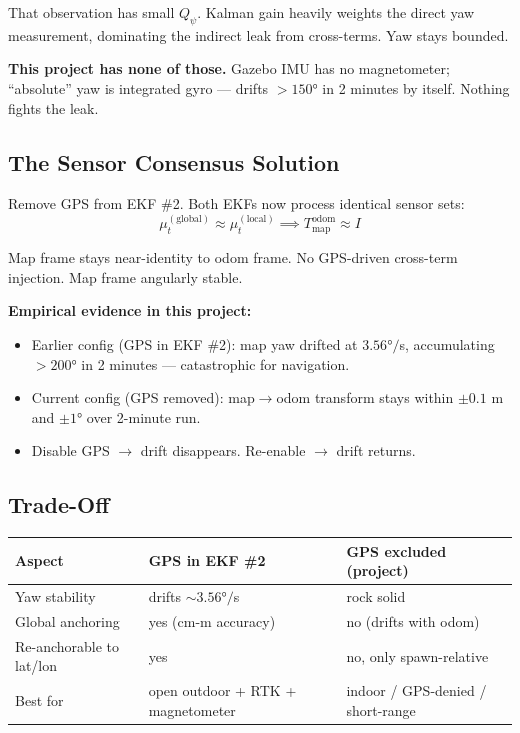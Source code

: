 \documentclass[11pt,a4paper]{article}
\begin{document}
That observation has small $Q_\psi$. Kalman gain heavily weights the direct yaw measurement, dominating the indirect leak from cross-terms. Yaw stays bounded.

\textbf{This project has none of those.} Gazebo IMU has no magnetometer; ``absolute'' yaw is integrated gyro --- drifts $> 150°$ in 2 minutes by itself. Nothing fights the leak.

\subsection{The Sensor Consensus Solution}

Remove GPS from EKF \#2. Both EKFs now process identical sensor sets:
\[
\mu_t^{(\text{global})} \approx \mu_t^{(\text{local})} \implies T_{\text{map}}^{\text{odom}} \approx I
\]

Map frame stays near-identity to odom frame. No GPS-driven cross-term injection. Map frame angularly stable.

\textbf{Empirical evidence in this project:}
\begin{itemize}
\item Earlier config (GPS in EKF \#2): map yaw drifted at $3.56°/$s, accumulating $> 200°$ in 2 minutes --- catastrophic for navigation.
\item Current config (GPS removed): map$\to$odom transform stays within $\pm 0.1$ m and $\pm 1°$ over 2-minute run.
\item Disable GPS $\to$ drift disappears. Re-enable $\to$ drift returns.
\end{itemize}

\subsection{Trade-Off}

\begin{center}
\footnotesize
\begin{tabular}{p{4cm} p{4cm} p{4cm}}
\toprule
\textbf{Aspect} & \textbf{GPS in EKF \#2} & \textbf{GPS excluded (project)} \\
\midrule
Yaw stability & drifts $\sim 3.56°/$s & rock solid \\
Global anchoring & yes (cm-m accuracy) & no (drifts with odom) \\
Re-anchorable to lat/lon & yes & no, only spawn-relative \\
Best for & open outdoor + RTK + magnetometer & indoor / GPS-denied / short-range \\
\bottomrule
\end{tabular}
\end{center}
\end{document}
